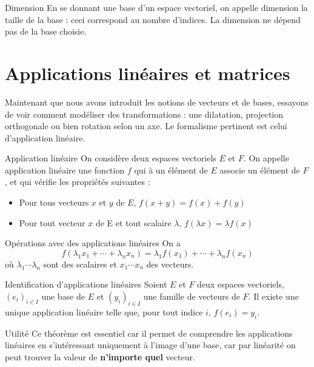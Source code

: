 \documentclass{classe}
\begin{document}
\begin{définition}{Dimension}{}
En se donnant une base d'un espace vectoriel, on appelle dimension la taille de la base : ceci correspond au nombre d'indices. La dimension ne dépend pas de la base choisie.
\end{définition}


\section{Applications linéaires et matrices}

Maintenant que nous avons introduit les notions de vecteurs et de bases, essayons de voir comment modéliser des transformations : une dilatation, projection orthogonale ou bien rotation selon un axe. Le formalisme pertinent est celui d'application linéaire.

\begin{définition}{Application linéaire}{}
On considère deux espaces vectoriels $E$ et $F$. On appelle application linéaire une fonction $f$ qui à un élément de $E$ associe un élément de $F$, et qui vérifie les propriétés suivantes :
\begin{itemize}
	\item Pour tous vecteurs $x$ et $y$ de $E$, $f(x+y) = f(x)+f(y)$
	\item Pour tout vecteur $x$ de E et tout scalaire $\lambda$, $f(\lambda x) = \lambda f(x)$
\end{itemize}
\end{définition}

\begin{propositionfr}{Opérations avec des applications linéaires}{}
On a 
$$f(\lambda_1 x_1 + \cdots + \lambda_n x_n) = \lambda_1 f(x_1) + \cdots + \lambda_n f(x_n)$$
où $\lambda_1 \cdots \lambda_n$ sont des scalaires et $x_1 \cdots x_n$ des vecteurs.
\end{propositionfr}

\begin{théorème}{Identification d'applications linéaires}{}
Soient $E$ et $F$ deux espaces vectoriels, $(e_i)_{i\in I}$ une base de $E$ et $(y_i)_{i\in I}$ une famille de vecteurs de $F$. Il existe une unique application linéaire telle que, pour tout indice $i$, $f(e_i) = y_i$.
\end{théorème}

\begin{remarque}{Utilité}{}
Ce théorème est essentiel car il permet de comprendre les applications linéaires en s'intéressant uniquement à l'image d'une base, car par linéarité on peut trouver la valeur de \textbf{n'importe quel} vecteur.
\end{remarque}
\end{document}
